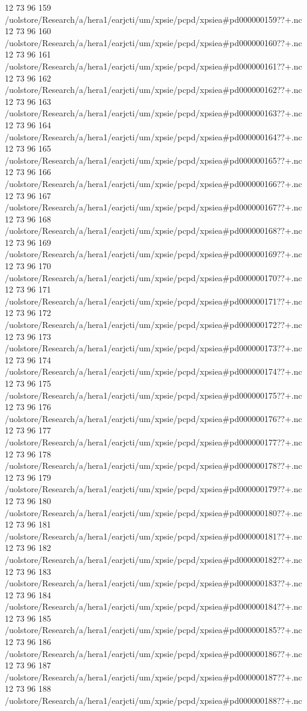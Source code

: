 12 73 96
159
/uolstore/Research/a/hera1/earjcti/um/xpsie/pcpd/xpsiea#pd000000159??+.nc
12 73 96
160
/uolstore/Research/a/hera1/earjcti/um/xpsie/pcpd/xpsiea#pd000000160??+.nc
12 73 96
161
/uolstore/Research/a/hera1/earjcti/um/xpsie/pcpd/xpsiea#pd000000161??+.nc
12 73 96
162
/uolstore/Research/a/hera1/earjcti/um/xpsie/pcpd/xpsiea#pd000000162??+.nc
12 73 96
163
/uolstore/Research/a/hera1/earjcti/um/xpsie/pcpd/xpsiea#pd000000163??+.nc
12 73 96
164
/uolstore/Research/a/hera1/earjcti/um/xpsie/pcpd/xpsiea#pd000000164??+.nc
12 73 96
165
/uolstore/Research/a/hera1/earjcti/um/xpsie/pcpd/xpsiea#pd000000165??+.nc
12 73 96
166
/uolstore/Research/a/hera1/earjcti/um/xpsie/pcpd/xpsiea#pd000000166??+.nc
12 73 96
167
/uolstore/Research/a/hera1/earjcti/um/xpsie/pcpd/xpsiea#pd000000167??+.nc
12 73 96
168
/uolstore/Research/a/hera1/earjcti/um/xpsie/pcpd/xpsiea#pd000000168??+.nc
12 73 96
169
/uolstore/Research/a/hera1/earjcti/um/xpsie/pcpd/xpsiea#pd000000169??+.nc
12 73 96
170
/uolstore/Research/a/hera1/earjcti/um/xpsie/pcpd/xpsiea#pd000000170??+.nc
12 73 96
171
/uolstore/Research/a/hera1/earjcti/um/xpsie/pcpd/xpsiea#pd000000171??+.nc
12 73 96
172
/uolstore/Research/a/hera1/earjcti/um/xpsie/pcpd/xpsiea#pd000000172??+.nc
12 73 96
173
/uolstore/Research/a/hera1/earjcti/um/xpsie/pcpd/xpsiea#pd000000173??+.nc
12 73 96
174
/uolstore/Research/a/hera1/earjcti/um/xpsie/pcpd/xpsiea#pd000000174??+.nc
12 73 96
175
/uolstore/Research/a/hera1/earjcti/um/xpsie/pcpd/xpsiea#pd000000175??+.nc
12 73 96
176
/uolstore/Research/a/hera1/earjcti/um/xpsie/pcpd/xpsiea#pd000000176??+.nc
12 73 96
177
/uolstore/Research/a/hera1/earjcti/um/xpsie/pcpd/xpsiea#pd000000177??+.nc
12 73 96
178
/uolstore/Research/a/hera1/earjcti/um/xpsie/pcpd/xpsiea#pd000000178??+.nc
12 73 96
179
/uolstore/Research/a/hera1/earjcti/um/xpsie/pcpd/xpsiea#pd000000179??+.nc
12 73 96
180
/uolstore/Research/a/hera1/earjcti/um/xpsie/pcpd/xpsiea#pd000000180??+.nc
12 73 96
181
/uolstore/Research/a/hera1/earjcti/um/xpsie/pcpd/xpsiea#pd000000181??+.nc
12 73 96
182
/uolstore/Research/a/hera1/earjcti/um/xpsie/pcpd/xpsiea#pd000000182??+.nc
12 73 96
183
/uolstore/Research/a/hera1/earjcti/um/xpsie/pcpd/xpsiea#pd000000183??+.nc
12 73 96
184
/uolstore/Research/a/hera1/earjcti/um/xpsie/pcpd/xpsiea#pd000000184??+.nc
12 73 96
185
/uolstore/Research/a/hera1/earjcti/um/xpsie/pcpd/xpsiea#pd000000185??+.nc
12 73 96
186
/uolstore/Research/a/hera1/earjcti/um/xpsie/pcpd/xpsiea#pd000000186??+.nc
12 73 96
187
/uolstore/Research/a/hera1/earjcti/um/xpsie/pcpd/xpsiea#pd000000187??+.nc
12 73 96
188
/uolstore/Research/a/hera1/earjcti/um/xpsie/pcpd/xpsiea#pd000000188??+.nc
